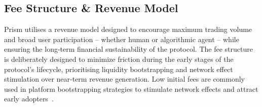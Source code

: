 \documentclass[11pt,a4paper]{article}
\begin{document}



\subsection{Fee Structure \& Revenue Model}



Prism utilises a revenue model designed to encourage maximum trading volume and broad user participation -- whether human or algorithmic agent -- while ensuring the long-term financial sustainability of the protocol. The fee structure is deliberately designed to minimize friction during the early stages of the protocol's lifecycle, prioritising liquidity bootstrapping and network effect stimulation over near-term revenue generation. Low initial fees are commonly used in platform bootstrapping strategies to stimulate network effects and attract early adopters~\cite{wolfers2004}.
\end{document}
